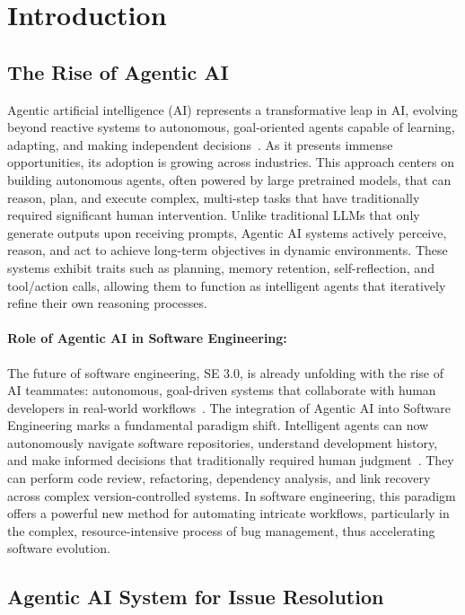 \section{Introduction}

\subsection{The Rise of Agentic AI}

Agentic artificial intelligence (AI) represents a transformative leap in AI, evolving beyond reactive systems to autonomous, goal-oriented agents capable of learning, adapting, and making independent decisions~\cite{agentic_ai1}. As it presents immense opportunities, its adoption is growing across industries.  This approach centers on building autonomous agents, often powered by large pretrained models, that can reason, plan, and execute complex, multi-step tasks that have traditionally required significant human intervention. Unlike traditional LLMs that only generate outputs upon receiving prompts, Agentic AI systems actively perceive, reason, and act to achieve long-term objectives in dynamic environments. These systems exhibit traits such as planning, memory retention, self-reflection, and tool/action calls, allowing them to function as intelligent agents that iteratively refine their own reasoning processes.

\paragraph{Role of Agentic AI in Software Engineering:}

The future of software engineering, SE 3.0, is already unfolding with the rise of AI teammates: autonomous, goal-driven systems that collaborate with human developers in real-world workflows~\cite{agentic_ai2}. The integration of Agentic AI into Software Engineering marks a fundamental paradigm shift. Intelligent agents can now autonomously navigate software repositories, understand development history, and make informed decisions that traditionally required human judgment~\cite{traceability,btlink}. They can perform code review, refactoring, dependency analysis, and link recovery across complex version-controlled systems. In software engineering, this paradigm offers a powerful new method for automating intricate workflows, particularly in the complex, resource-intensive process of bug management, thus accelerating software evolution.

\subsection{Agentic AI System for Issue Resolution}

